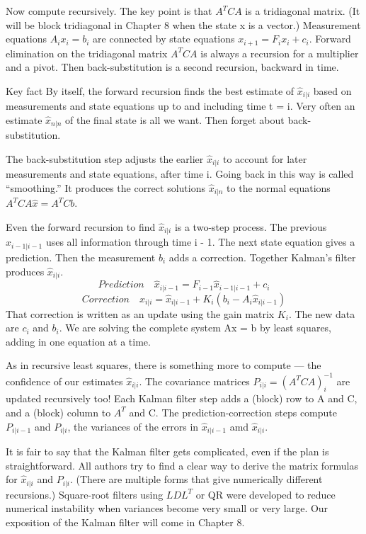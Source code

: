 	Now compute recursively. The key point is that $A^TCA$ is a tridiagonal matrix. (It
	will be block tridiagonal in Chapter 8 when the state x is a vector.) Measurement equations
	$A_ix_i=b_i$ are connected by state equations $x_{i+1}=F_ix_i+c_i$.	Forward elimination on
	the tridiagonal matrix $A^TCA$ is always a recursion for a multiplier and a pivot. Then
	back-substitution is a second recursion, backward in time.
	
	Key fact By itself, the forward recursion finds the best estimate of $\hat{x}_{i|i}$ based on measurements and state equations up to and including time t = i. Very often an estimate $\hat{x}_{n|n}$ of the final state is all we want. Then forget about back-substitution.
	
	The back-substitution step adjusts the earlier $\hat{x}_{i|i}$ to account for later measurements
	and state equations, after time i. Going back in this way is called “smoothing.” It produces
	the correct solutions $\hat{x}_{i|n}$ to the normal equations $A^TCA\hat{x}=A^TCb$.
	
	Even the forward recursion to find $\hat{x}_{i|i}$ is a two-step process. The previous
	$\hat{x}_{i-1|i-1}$ uses all information through time i - 1. The next state equation gives a prediction. Then the measurement $b_i$ adds a correction. Together Kalman's filter produces $\hat{x}_{i|i}$.
	\begin{equation*}
	Prediction \quad
	\hat{x}_{i|i-1}=F_{i-1}\hat{x}_{i-1|i-1}+c_i
	\end{equation*}
	\begin{equation*}
	Correction \quad
	\hat{x}_{i|i}=\hat{x}_{i|i-1}+K_i(b_i-A_i\hat{x}_{i|i-1})
	\end{equation*}
	That correction is written as an update using the gain matrix $K_i$. The new data are $c_i$ and $b_i$. We are solving the complete system Ax = b by least squares, adding in one equation at a
	time.
	
	As in recursive least squares, there is something more to compute — the confidence
	of our estimates $\hat{x}_{i|i}$. The covariance matrices $P_{i|i}=(A^TCA)^{-1}_i$
	are updated recursively too! Each Kalman filter step adds a (block) row to A and C, and a (block) column to $A^T$ and C. The prediction-correction steps compute $P_{i|i-1}$ and $P_{i|i}$, the variances of the errors in $\hat{x}_{i|i-1}$ amd $\hat{x}_{i|i}$.
	
	It is fair to say that the Kalman filter gets complicated, even if the plan is straightforward. All authors try to find a clear way to derive the matrix formulas for $\hat{x}_{i|i}$ and $P_{i|i}$. (There are multiple forms that give numerically different recursions.) Square-root filters using $LDL^T$ or QR were developed to reduce numerical instability when variances become very small or very large. Our exposition of the Kalman filter will come in Chapter 8.
	
